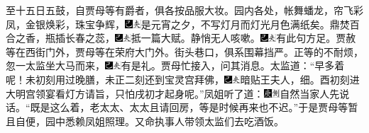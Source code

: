 至十五日五鼓，自贾母等有爵者，俱各按品服大妆。园内各处，帐舞蟠龙，帘飞彩凤，金银焕彩，珠宝争辉，{\includegraphics[width=3mm]{../Images/00003}\includegraphics[width=3mm]{../Images/00012}\footnotesize \kaishu 是元宵之夕，不写灯月而灯光月色满纸矣。}鼎焚百合之香，瓶插长春之蕊，{\includegraphics[width=3mm]{../Images/00003}\includegraphics[width=3mm]{../Images/00012}\footnotesize \kaishu 抵一篇大赋。}静悄无人咳嗽。{\includegraphics[width=3mm]{../Images/00003}\includegraphics[width=3mm]{../Images/00012}\footnotesize \kaishu 有此句方足。}贾赦等在西街门外，贾母等在荣府大门外。街头巷口，俱系围幕挡严。正等的不耐烦，忽一太监坐大马而来，{\includegraphics[width=3mm]{../Images/00003}\includegraphics[width=3mm]{../Images/00012}\footnotesize \kaishu 有是礼。}贾母忙接入，问其消息。太监道：“早多着呢！未初刻用过晚膳，未正二刻还到宝灵宫拜佛，{\includegraphics[width=3mm]{../Images/00003}\includegraphics[width=3mm]{../Images/00012}\footnotesize \kaishu 暗贴王夫人，细。}酉初刻进大明宫领宴看灯方请旨，只怕戌初才起身呢。”凤姐听了道：{\includegraphics[width=3mm]{../Images/00004}\includegraphics[width=3mm]{../Images/00011}\footnotesize \kaishu 自然当家人先说话。}“既是这么着，老太太、太太且请回房，等是时候再来也不迟。”于是贾母等暂且自便，园中悉赖凤姐照理。又命执事人带领太监们去吃酒饭。


